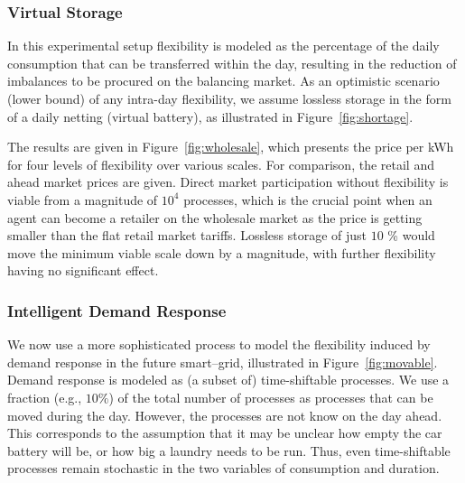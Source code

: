 \documentclass[conference]{IEEEtran}
\begin{document}
\subsubsection{Virtual Storage}

In this experimental setup flexibility is modeled as the percentage of the daily consumption that can be transferred within the day, resulting in the reduction of imbalances to be procured on the balancing market. As an optimistic scenario (lower bound) of any intra-day flexibility, we assume lossless storage in the form of a daily netting (virtual battery), as illustrated in Figure~\ref{fig:shortage}.

The results are given in Figure~\ref{fig:wholesale}, which presents the price per kWh for four levels of flexibility over various scales. For comparison, the retail and ahead market prices are given. Direct market participation without flexibility is viable from a magnitude of $10^4$ processes, which is the crucial point when an agent can become a retailer on the wholesale market as the price is getting smaller than the flat retail market tariffs. Lossless storage of just $10$ \% would move the minimum viable scale down by a magnitude, with further flexibility having no significant effect.

\subsubsection{Intelligent Demand Response}

We now use a more sophisticated process to model the flexibility induced by demand response in the future smart--grid, illustrated in Figure~\ref{fig:movable}. Demand response is modeled as (a subset of) time-shiftable processes. We use a fraction (e.g., $10\%$) of the total number of processes as processes that can be moved during the day. However, the processes are not know on the day ahead. This corresponds to the assumption that it may be unclear how empty the car battery will be, or how big a laundry needs to be run. Thus, even time-shiftable processes remain stochastic in the two variables of consumption and duration.
\end{document}
